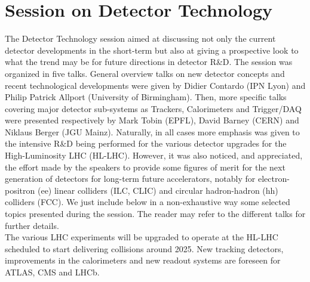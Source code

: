 \section{Session on Detector Technology}\label{detectors}


The Detector Technology session aimed at discussing not only the current detector developments in the short-term but also at giving a prospective look to what the trend may be for future directions in detector R\&D. The session was organized in five talks. General overview talks on new detector concepts and recent technological developments were given by Didier Contardo (IPN Lyon) and Philip Patrick Allport (University of Birmingham). Then, more specific talks covering major detector sub-systems as Trackers, Calorimeters and Trigger/DAQ were presented respectively by Mark Tobin (EPFL), David Barney (CERN) and Niklaus Berger (JGU Mainz). Naturally, in all cases more emphasis was given to the intensive R\&D being performed for the various detector upgrades for the High-Luminosity LHC (HL-LHC). However, it was also noticed, and appreciated, the effort made by the speakers to provide some figures of merit for the next generation of detectors for long-term future accelerators, notably for electron-positron (ee) linear colliders (ILC, CLIC) and circular hadron-hadron (hh) colliders (FCC). We just include below in a non-exhaustive way some selected topics presented during the session. The reader may refer to the different talks for further details.\\ 

The various LHC experiments will be upgraded to operate at the HL-LHC scheduled to start delivering collisions around 2025. New tracking detectors, improvements in the calorimeters and new readout systems are foreseen for ATLAS, CMS and LHCb. 

